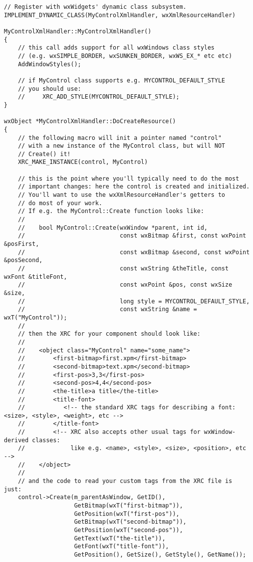 \begin{verbatim}
// Register with wxWidgets' dynamic class subsystem.
IMPLEMENT_DYNAMIC_CLASS(MyControlXmlHandler, wxXmlResourceHandler)

MyControlXmlHandler::MyControlXmlHandler()
{
    // this call adds support for all wxWindows class styles
    // (e.g. wxSIMPLE_BORDER, wxSUNKEN_BORDER, wxWS_EX_* etc etc)
    AddWindowStyles();

    // if MyControl class supports e.g. MYCONTROL_DEFAULT_STYLE
    // you should use:
    //     XRC_ADD_STYLE(MYCONTROL_DEFAULT_STYLE);
}

wxObject *MyControlXmlHandler::DoCreateResource()
{
    // the following macro will init a pointer named "control"
    // with a new instance of the MyControl class, but will NOT
    // Create() it!
    XRC_MAKE_INSTANCE(control, MyControl)

    // this is the point where you'll typically need to do the most
    // important changes: here the control is created and initialized.
    // You'll want to use the wxXmlResourceHandler's getters to
    // do most of your work.
    // If e.g. the MyControl::Create function looks like:
    //
    //    bool MyControl::Create(wxWindow *parent, int id, 
    //                           const wxBitmap &first, const wxPoint &posFirst,
    //                           const wxBitmap &second, const wxPoint &posSecond,
    //                           const wxString &theTitle, const wxFont &titleFont,
    //                           const wxPoint &pos, const wxSize &size,
    //                           long style = MYCONTROL_DEFAULT_STYLE,
    //                           const wxString &name = wxT("MyControl"));
    //
    // then the XRC for your component should look like:
    //
    //    <object class="MyControl" name="some_name">
    //        <first-bitmap>first.xpm</first-bitmap>
    //        <second-bitmap>text.xpm</second-bitmap>
    //        <first-pos>3,3</first-pos>
    //        <second-pos>4,4</second-pos>
    //        <the-title>a title</the-title>
    //        <title-font>
    //           <!-- the standard XRC tags for describing a font: <size>, <style>, <weight>, etc -->
    //        </title-font>
    //        <!-- XRC also accepts other usual tags for wxWindow-derived classes:
    //             like e.g. <name>, <style>, <size>, <position>, etc -->
    //    </object>
    //
    // and the code to read your custom tags from the XRC file is just:
    control->Create(m_parentAsWindow, GetID(),
                    GetBitmap(wxT("first-bitmap")),
                    GetPosition(wxT("first-pos")),
                    GetBitmap(wxT("second-bitmap")),
                    GetPosition(wxT("second-pos")),
                    GetText(wxT("the-title")),
                    GetFont(wxT("title-font")),
                    GetPosition(), GetSize(), GetStyle(), GetName());


\end{verbatim}
